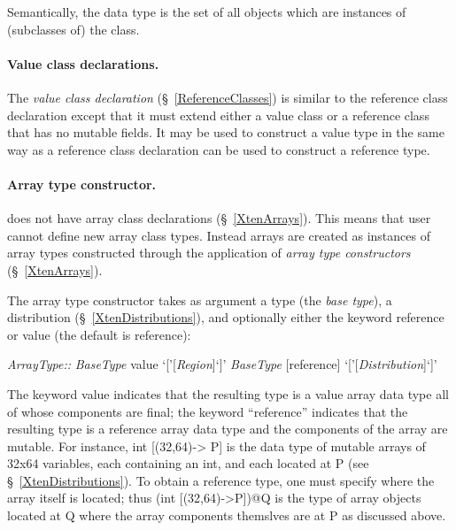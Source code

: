 Semantically, the data type is the set of all objects
which are instances of (subclasses of) the class.

\paragraph{Value class declarations.}
The {\em value class declaration} (\S~\ref{ReferenceClasses}) is
similar to the reference class declaration except that it must extend
either a value class or a reference class that has no mutable
fields. 
It may be used to construct a value type in the same way as a
reference class declaration can be used to construct a reference
type. 

\paragraph{Array type constructor.}

{}\XtenCurrVer{} does not have array class declarations
(\S~\ref{XtenArrays}). This means that user cannot define new array
class types. Instead arrays are created as instances of array types
constructed through the application of {\em array type constructors}
(\S~\ref{XtenArrays}).

The array type constructor takes as argument a type (the {\em
base type}), a distribution (\S~\ref{XtenDistributions}), and
optionally either the keyword {\cf reference} or {\cf value}
(the default is reference):
\begin{x10}
{\em{}ArrayType::}
 {\em{}BaseType} value `['[{\em{}Region}]`]'
 {\em{}BaseType} [reference] `['[{\em{}Distribution}]`]'
\end{x10}


The keyword {\cf value} indicates that the resulting type is a value
array data type all of whose components are final; the keyword
``reference'' indicates that the resulting type is a reference array
data type and the components of the array are mutable.  For instance,
{\cf int [(32,64)-> P]} is the data type of mutable arrays of {\cf
32x64} variables, each containing an {\cf int}, and each located at
{\cf P} (see \S~\ref{XtenDistributions}).  To obtain a reference type,
one must specify where the array itself is located; thus {\cf (int
[(32,64)->P])@Q} is the type of array objects located at {\cf Q} where
the array components themslves are at {\cf P} as discussed above.

